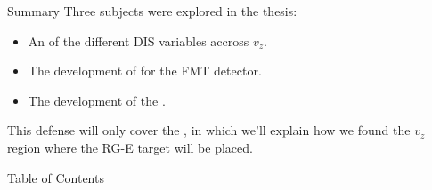 \documentclass[aspectratio=169]{beamer}
\begin{document}

    \begin{frame}
        \titlepage
    \end{frame}

    \begin{frame}{Summary}
        Three subjects were explored in the thesis:

        \vspace{12pt}

        \begin{itemize}
            \item
                An  of the different DIS variables accross $v_z$.

            \vspace{6pt}
            \item
                The development of  for the FMT detector.

            \vspace{6pt}
            \item
                The development of the .
        \end{itemize}

        \vspace{12pt}

        This defense will only cover the , in which we'll explain how we found the $v_z$ region where the RG-E target will be placed.
    \end{frame}

    \begin{frame}{Table of Contents}
        \tableofcontents
    \end{frame}



    \addtocounter{framenumber}{-3}

    \graphicspath{{10context/img}}
    

    \graphicspath{{11data_analysis/img}}
    

    \graphicspath{{12study_results/img}}
    

    \graphicspath{{20backup/img}}
    
\end{document}
